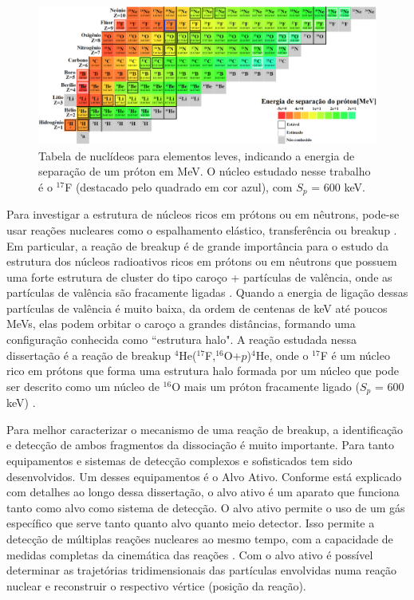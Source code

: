 \documentclass[a4paper,12pt,oneside]{book}
\begin{document}
\begin{figure}[H]
    \centering
    \includegraphics[scale = 0.25]{figs/chart_nuclides_2.png}
    \caption{Tabela de nuclídeos para elementos leves, indicando a energia de separação de um próton em MeV. O núcleo estudado nesse trabalho é o $^{17}$F (destacado pelo quadrado em cor azul), com $S_p$ = 600 keV. \cite{colourful_nuclide_chat}}
    \label{fig:chart_nuclides}
\end{figure}

\par Para investigar a estrutura de núcleos ricos em prótons ou em nêutrons, pode-se usar reações nucleares como o espalhamento elástico, transferência ou breakup \cite{Kolata2016}. Em particular, a reação de breakup é de grande importância para o estudo da estrutura dos núcleos radioativos ricos em prótons ou em nêutrons que possuem uma forte estrutura de cluster do tipo caroço + partículas de valência, onde as partículas de valência são fracamente ligadas \cite{Kolata2016, MORO_BREAKUP}. Quando a energia de ligação dessas partículas de valência é muito baixa, da ordem de centenas de keV até poucos MeVs, elas podem orbitar o caroço a grandes distâncias, formando uma configuração conhecida como ``estrutura halo". A reação estudada nessa dissertação é a reação de breakup $^4$He($^{17}$F,$^{16}$O+$p$)$^4$He, onde o $^{17}$F é um núcleo rico em prótons que forma uma estrutura halo formada por um núcleo que pode ser descrito como um núcleo de $^{16}$O mais um próton fracamente ligado ($S_p$ = 600 keV) \cite{MORO_BREAKUP}.

\par Para melhor caracterizar o mecanismo de uma reação de breakup, a identificação e detecção de ambos fragmentos da dissociação é muito importante. Para tanto equipamentos e sistemas de detecção complexos e sofisticados tem sido desenvolvidos. Um desses equipamentos é o Alvo Ativo. Conforme está explicado com detalhes ao longo dessa dissertação, o alvo ativo é um aparato que funciona tanto como alvo como sistema de detecção. O alvo ativo permite o uso de um gás específico que serve tanto quanto alvo quanto meio detector. Isso permite a detecção de múltiplas reações nucleares ao mesmo tempo, com a capacidade de medidas completas da cinemática das reações \cite{FORTINO2022166497, josh_bradt, attpc}. Com o alvo ativo é possível determinar as trajetórias tridimensionais das partículas envolvidas numa reação nuclear e reconstruir o respectivo vértice (posição da reação).
\end{document}

